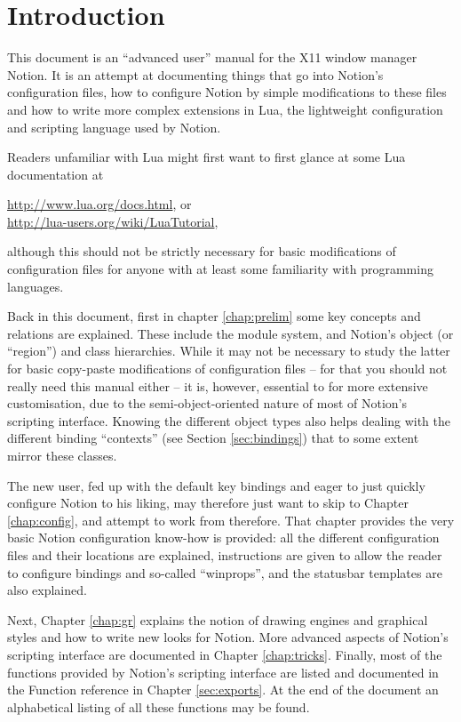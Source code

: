
\chapter{Introduction}

This document is an ``advanced user'' manual for the X11 window manager
Notion. It is an attempt at documenting things that go into Notion's
configuration files, how to configure Notion by simple modifications 
to these files and how to write more complex extensions in Lua, the 
lightweight configuration and scripting language used by Notion. 

Readers unfamiliar with Lua might first want to first glance at some 
Lua documentation at

\begin{center}
    \url{http://www.lua.org/docs.html}, or \\
    \url{http://lua-users.org/wiki/LuaTutorial},
\end{center}

although this should not be strictly necessary for basic modifications
of configuration files for anyone with at least some familiarity with
programming languages.

Back in this document, first in chapter \ref{chap:prelim} some key
concepts and relations are explained. These include the module system,
and Notion's object (or ``region'') and class hierarchies. While it may
not be necessary to study the latter for basic copy-paste modifications
of configuration files -- for that you should not really need this
manual either -- it is, however, essential to for more extensive
customisation, due to the semi-object-oriented nature of most of
Notion's scripting interface. Knowing the different object types also
helps dealing with the different binding ``contexts'' (see
Section \ref{sec:bindings}) that to some extent mirror these classes.

The new user, fed up with the default key bindings and eager to 
just quickly configure Notion to his liking, may therefore just want
to skip to Chapter \ref{chap:config}, and attempt to work from therefore.
That chapter provides the very basic Notion configuration know-how
is provided: all the different configuration files and their locations
are explained, instructions are given to allow the reader to
configure bindings and so-called ``winprops'', and the statusbar
templates are also explained. 

Next, Chapter \ref{chap:gr} explains the notion of drawing engines
and graphical styles and how to write new looks for Notion. More advanced
aspects of Notion's scripting interface are documented in Chapter 
\ref{chap:tricks}. 
Finally, most of the functions provided by Notion's scripting interface
are listed and documented in the Function reference in Chapter
\ref{sec:exports}. At the end of the document an alphabetical
listing of all these functions may be found.

